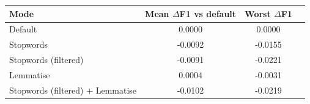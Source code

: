 \begin{tabular}{lccc}
\toprule
Mode & Mean $\Delta$F1 vs default & Worst $\Delta$F1 \\
\midrule
Default & 0.0000 & 0.0000 \\
Stopwords & -0.0092 & -0.0155 \\
Stopwords (filtered) & -0.0091 & -0.0221 \\
Lemmatise & 0.0004 & -0.0031 \\
Stopwords (filtered) + Lemmatise & -0.0102 & -0.0219 \\
\bottomrule
\end{tabular}
